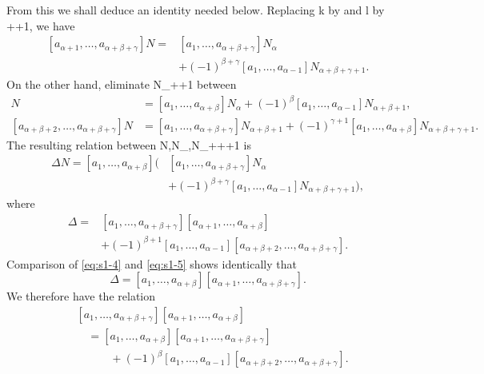 \documentclass[
  paper=b5,
  fontsize=13pt,
  twoside,
  headings=normal,
  bookmarkpackage=false
]{scrartcl}
\theoremstyle{stieltjesplain}
\theoremstyle{stieltjesdefinition}
\def\({}\def\){}%
\begin{document}
From this we shall deduce an identity needed below. Replacing \(k\) by
\(\alpha\) and \(l\) by \(\beta+\gamma+1\), we have
\begin{equation}
 \begin{split}
 [a_{\alpha+1},\ldots,a_{\alpha+\beta+\gamma}]N
  ={}&[a_1,\ldots,a_{\alpha+\beta+\gamma}]N_\alpha\\
    &+(-1)^{\beta+\gamma}[a_1,\ldots,a_{\alpha-1}]
      N_{\alpha+\beta+\gamma+1}.
 \end{split}
 \tag{4}\label{eq:s1-4}
\end{equation}
On the other hand, eliminate \(N_{\alpha+\beta+1}\) between
\begin{align*}
 [a_{\alpha+1},\ldots,a_{\alpha+\beta}]N
  &=[a_1,\ldots,a_{\alpha+\beta}]N_\alpha
    +(-1)^\beta[a_1,\ldots,a_{\alpha-1}]N_{\alpha+\beta+1},\\
 [a_{\alpha+\beta+2},\ldots,a_{\alpha+\beta+\gamma}]N
  &=[a_1,\ldots,a_{\alpha+\beta+\gamma}]N_{\alpha+\beta+1}
    +(-1)^{\gamma+1}[a_1,\ldots,a_{\alpha+\beta}]
      N_{\alpha+\beta+\gamma+1}.
\end{align*}
The resulting relation between \(N,N_\alpha,N_{\alpha+\beta+\gamma+1}\)
is
\begin{equation}
 \begin{split}
 \Delta N=[a_1,\ldots,a_{\alpha+\beta}]
 \bigl(&[a_1,\ldots,a_{\alpha+\beta+\gamma}]N_\alpha\\
 &+(-1)^{\beta+\gamma}[a_1,\ldots,a_{\alpha-1}]
 N_{\alpha+\beta+\gamma+1}\bigr),
 \end{split}
 \tag{5}\label{eq:s1-5}
\end{equation}
where
\[
 \begin{split}
 \Delta={}&[a_1,\ldots,a_{\alpha+\beta+\gamma}]
             [a_{\alpha+1},\ldots,a_{\alpha+\beta}]\\
 &+(-1)^{\beta+1}[a_1,\ldots,a_{\alpha-1}]
             [a_{\alpha+\beta+2},\ldots,a_{\alpha+\beta+\gamma}].
 \end{split}
\]
Comparison of \eqref{eq:s1-4} and \eqref{eq:s1-5} shows identically that
\[
 \Delta=[a_1,\ldots,a_{\alpha+\beta}]
         [a_{\alpha+1},\ldots,a_{\alpha+\beta+\gamma}].
\]
We therefore have the relation
\begin{equation}
 \begin{split}
 &[a_1,\ldots,a_{\alpha+\beta+\gamma}]
  [a_{\alpha+1},\ldots,a_{\alpha+\beta}]\\
 &\quad=[a_1,\ldots,a_{\alpha+\beta}]
  [a_{\alpha+1},\ldots,a_{\alpha+\beta+\gamma}]\\
 &\qquad\quad+(-1)^\beta[a_1,\ldots,a_{\alpha-1}]
  [a_{\alpha+\beta+2},\ldots,a_{\alpha+\beta+\gamma}].
 \end{split}
 \tag{A}\label{eq:s1-A}
\end{equation}
\end{document}
